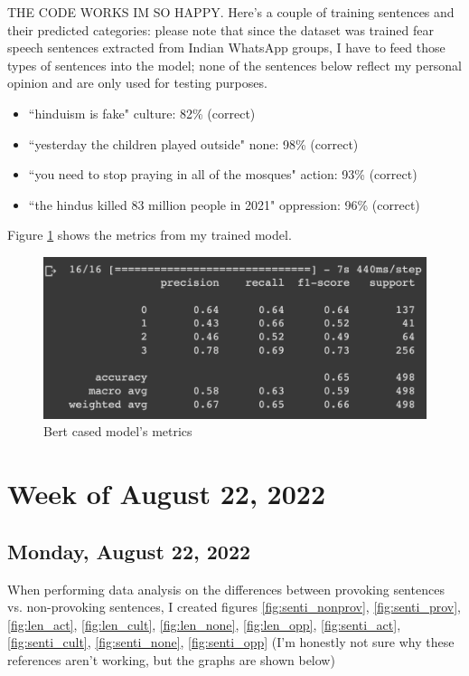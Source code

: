 \documentclass[11pt,letterpaper]{article}
\begin{document}
THE CODE WORKS IM SO HAPPY. Here's a couple of training sentences and their predicted categories: please note that since the dataset was trained fear speech sentences extracted from Indian WhatsApp groups, I have to feed those types of sentences into the model; none of the sentences below reflect my personal opinion and are only used for testing purposes.
\begin{itemize}
    \item ``hinduism is fake" culture: 82\% (correct)
    \item ``yesterday the children played outside" none: 98\% (correct)
    \item ``you need to stop praying in all of the mosques" action: 93\% (correct)
    \item ``the hindus killed 83 million people in 2021" oppression: 96\% (correct)
\end{itemize}

Figure \ref{fig:bert_cased_metrics} shows the metrics from my trained model.

\begin{figure}
    \centering
    \includegraphics[scale=0.7]{images/bert_cased_metrics.png}
    \caption{Bert cased model's metrics}
    \label{fig:bert_cased_metrics}
\end{figure}

\section{Week of August 22, 2022}
\subsection{Monday, August 22, 2022}
When performing data analysis on the differences between provoking sentences vs. non-provoking sentences, I created figures \ref{fig:senti_nonprov}, \ref{fig:senti_prov}, \ref{fig:len_act}, \ref{fig:len_cult}, \ref{fig:len_none}, \ref{fig:len_opp}, \ref{fig:senti_act}, \ref{fig:senti_cult}, \ref{fig:senti_none}, \ref{fig:senti_opp} (I'm honestly not sure why these references aren't working, but the graphs are shown below)
\end{document}
